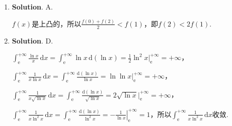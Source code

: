 \documentclass[../main.tex]{subfiles}
\begin{document}
\begin{enumerate}
    \item \textbf{Solution}. A.

          $f(x)$是上凸的，所以$\frac{f(0)+f(2)}{2}<f(1)$，即$f(2)<2f(1)$.

    \item \textbf{Solution}. D.

          $\int_{\mathrm{e}}^{+\infty}\frac{\ln x}{x}\,\mathrm{d}x=\int_{\mathrm{e}}^{+\infty}
              \ln x\,\mathrm{d}(\ln x)=\frac{1}{2}\ln^{2} x\bigg|_{\mathrm{e}}^{+\infty}=+\infty$，

          $\int_{\mathrm{e}}^{+\infty}\frac{1}{x\ln x}\,\mathrm{d}x=\int_{\mathrm{e}}^{+\infty}
              \frac{\mathrm{d}(\ln x)}{\ln x}=\ln\ln x\bigg|_{\mathrm{e}}^{+\infty}=+\infty$，

          $\int_{\mathrm{e}}^{+\infty}\frac{1}{x\sqrt{\ln x}}\,\mathrm{d}x=\int_{\mathrm{e}}
              ^{+\infty}\frac{\mathrm{d}(\ln x)}{\sqrt{\ln x}}=2\sqrt{\ln x}\bigg|_{\mathrm{e}}
              ^{+\infty}=+\infty$，

          $\int_{\mathrm{e}}^{+\infty}\frac{1}{x\ln^{2} x}\,\mathrm{d}x=\int_{\mathrm{e}}
              ^{+\infty}\frac{\mathrm{d}(\ln x)}{\ln^{2} x}=\left.-\frac{1}{\ln x}\right|
              _{\mathrm{e}}^{+\infty}=1$，所以$\int_{\mathrm{e}}^{+\infty}\frac{1}{x\ln^{2}
                  x}\,\mathrm{d}x$收敛.
\end{enumerate}
\end{document}
